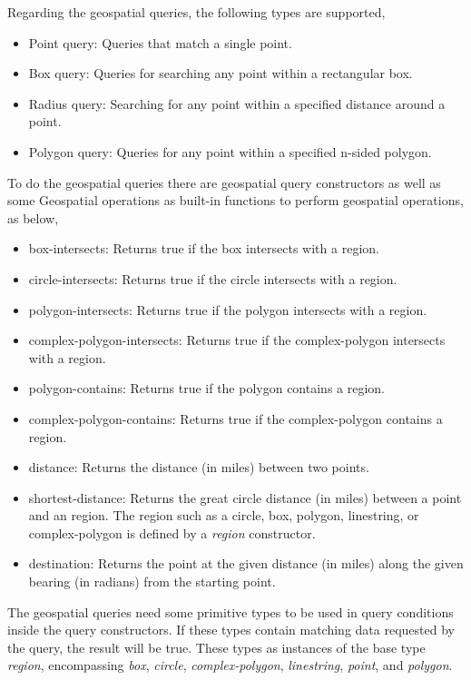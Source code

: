 \documentclass[a4paper,12pt]{article}
\begin{document}
Regarding the geospatial queries, the following types are supported,
\begin{itemize}
\item Point query: Queries that match a single point.
\item Box query: Queries for searching any point within a rectangular box.
\item Radius query: Searching for any point within a specified distance around a point.
\item Polygon query: Queries for any point within a specified n-sided polygon.
\end{itemize}

To do the geospatial queries there are geospatial query constructors as well as some Geospatial operations as built-in functions to perform geospatial operations, as below,
\begin{itemize}
\item box-intersects: Returns true if the box intersects with a region.
\item circle-intersects: Returns true if the circle intersects with a region.
\item polygon-intersects: Returns true if the polygon intersects with a region.
\item complex-polygon-intersects: Returns true if the complex-polygon intersects with a region.
\item polygon-contains: Returns true if the polygon contains a region.
\item complex-polygon-contains: Returns true if the complex-polygon contains a region.
\item distance: Returns the distance (in miles) between two points.
\item shortest-distance: Returns the great circle distance (in miles) between a point and an region. The region such as a circle, box, polygon, linestring, or complex-polygon is defined by a \textit{region} constructor.
\item destination: Returns the point at the given distance (in miles) along the given bearing (in radians) from the starting point.
\end{itemize}
The geospatial queries need some primitive types to be used in query conditions inside the query constructors. If these types contain matching data requested by the query, the result will be true. These types as instances of the base type \textit{region}, encompassing \textit{box}, \textit{circle}, \textit{complex-polygon}, \textit{linestring}, \textit{point}, and \textit{polygon}. 
\end{document}
